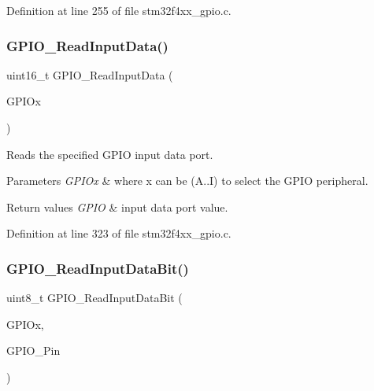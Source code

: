 Definition at line 255 of file stm32f4xx\+\_\+gpio.\+c.

\mbox{\label{group___g_p_i_o_ga139a33adc8409288e9f193bbebb5a0f7}} 
\subsubsection{\texorpdfstring{G\+P\+I\+O\+\_\+\+Read\+Input\+Data()}{GPIO\_ReadInputData()}}
{\footnotesize\ttfamily uint16\+\_\+t G\+P\+I\+O\+\_\+\+Read\+Input\+Data (\begin{DoxyParamCaption}\item[{\hyperlink{struct_g_p_i_o___type_def}{G\+P\+I\+O\+\_\+\+Type\+Def} $\ast$}]{G\+P\+I\+Ox }\end{DoxyParamCaption})}



Reads the specified G\+P\+IO input data port. 


\begin{DoxyParams}{Parameters}
{\em G\+P\+I\+Ox} & where x can be (A..I) to select the G\+P\+IO peripheral. \\
\hline
\end{DoxyParams}

\begin{DoxyRetVals}{Return values}
{\em G\+P\+IO} & input data port value. \\
\hline
\end{DoxyRetVals}


Definition at line 323 of file stm32f4xx\+\_\+gpio.\+c.

\mbox{\label{group___g_p_i_o_ga98772ef6b639b3fa06c8ae5ba28d3aaa}} 
\subsubsection{\texorpdfstring{G\+P\+I\+O\+\_\+\+Read\+Input\+Data\+Bit()}{GPIO\_ReadInputDataBit()}}
{\footnotesize\ttfamily uint8\+\_\+t G\+P\+I\+O\+\_\+\+Read\+Input\+Data\+Bit (\begin{DoxyParamCaption}\item[{\hyperlink{struct_g_p_i_o___type_def}{G\+P\+I\+O\+\_\+\+Type\+Def} $\ast$}]{G\+P\+I\+Ox,  }\item[{uint16\+\_\+t}]{G\+P\+I\+O\+\_\+\+Pin }\end{DoxyParamCaption})}



